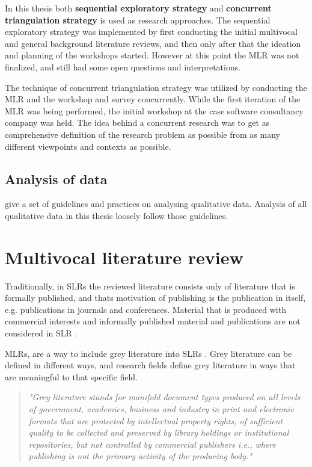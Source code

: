 \documentclass[english, 12pt, a4paper, sci, utf8, a-1b, online]{aaltothesis}
\begin{document}
In this thesis both \textbf{sequential exploratory strategy} and \textbf{concurrent triangulation strategy} is used as research approaches. The sequential exploratory strategy was implemented by first conducting the initial multivocal and general background literature reviews, and then only after that the ideation and planning of the workshops started. However at this point the MLR was not finalized, and still had some open questions and interpretations.

The technique of concurrent triangulation strategy was utilized by conducting the MLR and the workshop and survey concurrently. While the first iteration of the MLR was being performed, the initial workshop at the case software consultancy company was held. The idea behind a concurrent research was to get as comprehensive definition of the research problem as possible from as many different viewpoints and contexts as possible.

\subsection{Analysis of data}

\cite{analyzing-qualitative-data} give a set of guidelines and practices on analysing qualitative data. Analysis of all qualitative data in this thesis loosely follow those guidelines.

\clearpage
\section{Multivocal literature review}

Traditionally, in SLRs the reviewed literature consists only of literature that is formally published, and thats motivation of publishing is the publication in itself, e.g. publications in journals and conferences. Material that is produced with commercial interests and informally published material and publications are not considered in SLR \citep{guidelines-for-MLR}.

MLRs, are a way to include grey literature into SLRs \citep{the-need-for-MLR}. Grey literature can be defined in different ways, and research fields define grey literature in ways that are meaningful to that specific field.

\begin{quotation}
  \textit{"Grey literature stands for manifold document types produced on all levels of government, academics, business and industry in print and electronic formats that are protected by intellectual property rights, of sufficient quality to be collected and preserved by library holdings or institutional repositories, but not controlled by commercial publishers i.e., where publishing is not the primary activity of the producing body."} \citep{towards-a-prague-definition-of-grey-literature}
\end{quotation}
\end{document}
